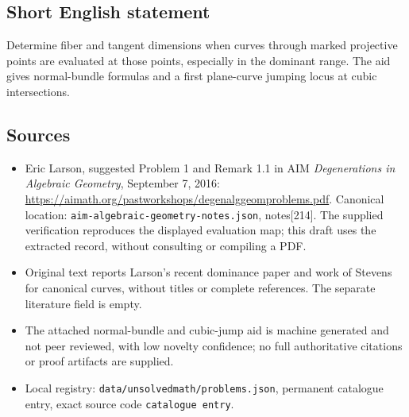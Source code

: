 \documentclass[11pt]{article}
\begin{document}
\subsection{Short English statement}
Determine fiber and tangent dimensions when curves through marked projective points are evaluated at those points, especially in the dominant range. The aid gives normal-bundle formulas and a first plane-curve jumping locus at cubic intersections.
\subsection{Sources}
\begin{itemize}
\item Eric Larson, suggested Problem 1 and Remark 1.1 in AIM \emph{Degenerations in Algebraic Geometry}, September 7, 2016: \url{https://aimath.org/pastworkshops/degenalggeomproblems.pdf}. Canonical location: \texttt{aim-algebraic-geometry-notes.json}, notes[214]. The supplied verification reproduces the displayed evaluation map; this draft uses the extracted record, without consulting or compiling a PDF.
\item Original text reports Larson's recent dominance paper and work of Stevens for canonical curves, without titles or complete references. The separate literature field is empty.
\item The attached normal-bundle and cubic-jump aid is machine generated and not peer reviewed, with low novelty confidence; no full authoritative citations or proof artifacts are supplied.
\item Local registry: \texttt{data/unsolvedmath/problems.json}, permanent catalogue entry, exact source code \texttt{catalogue entry}.
\end{itemize}
\end{document}

